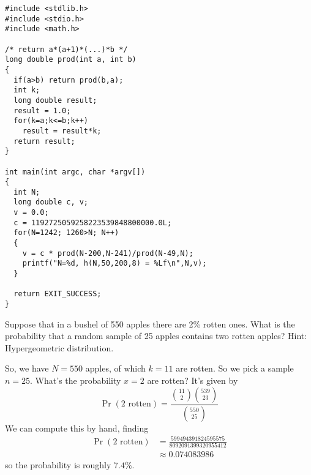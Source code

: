 \begin{lstlisting}
#include <stdlib.h>
#include <stdio.h>
#include <math.h>

/* return a*(a+1)*(...)*b */
long double prod(int a, int b)
{
  if(a>b) return prod(b,a);
  int k;
  long double result;
  result = 1.0;
  for(k=a;k<=b;k++)
    result = result*k;
  return result;
}

int main(int argc, char *argv[])
{
  int N;
  long double c, v;
  v = 0.0;
  c = 1192725059258223539848800000.0L;
  for(N=1242; 1260>N; N++)
  {
    v = c * prod(N-200,N-241)/prod(N-49,N);
    printf("N=%d, h(N,50,200,8) = %Lf\n",N,v);
  }

  return EXIT_SUCCESS;
}
\end{lstlisting}

Suppose that in a bushel of 550 apples there are 2\% rotten ones. What
is the probability that a random sample of 25 apples contains two
rotten apples? Hint: Hypergeometric distribution.

So, we have $N=550$ apples, of which $k=11$ are rotten. So we pick a
sample $n=25$. What's the probability $x=2$ are rotten? It's given by
\begin{equation}
\Pr(\mbox{2 rotten})=\frac{\binom{11}{2}\binom{539}{23}}{\binom{550}{25}}
\end{equation}
We can compute this by hand, finding
\begin{equation}
\begin{split}
\Pr(\mbox{2 rotten})
&=\frac{599494391824595575}{8092091399320955412}\\
&\approx 0.074083986
\end{split}
\end{equation}
so the probability is roughly $7.4\%$.
